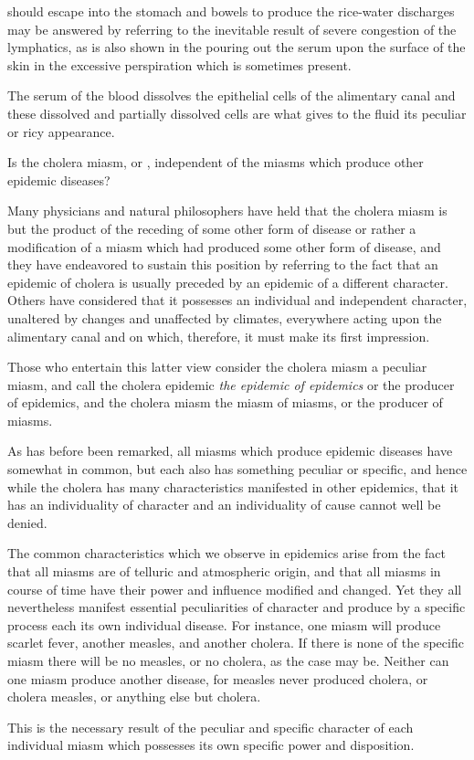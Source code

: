 should escape into the stomach and bowels to produce the rice-water
discharges may be answered by referring to the inevitable result of severe
congestion of the lymphatics, as is also shown in the pouring out the
serum upon the surface of the skin in the excessive perspiration which
is sometimes present.

The serum of the blood dissolves the epithelial cells of the alimentary
canal and these dissolved and partially dissolved cells are what gives to
the fluid its peculiar or ricy appearance.

\vspace{\baselineskip}

Is the cholera miasm, or , independent of the miasms which
produce other epidemic diseases?

Many physicians and natural philosophers have held that the cholera
miasm is but the product of the receding of some other form of disease
or rather a modification of a miasm which had produced some other
form of disease, and they have endeavored to sustain this position by
referring to the fact that an epidemic of cholera is usually preceded by
an epidemic of a different character. Others have considered that it
possesses an individual and independent character, unaltered by changes
and unaffected by climates, everywhere acting upon the alimentary canal
and on which, therefore, it must make its first impression.

Those who entertain this latter view consider the cholera miasm a
peculiar miasm, and call the cholera epidemic \emph{the epidemic of epidemics}
or the producer of epidemics, and the cholera miasm the miasm of
miasms, or the producer of miasms.

As has before been remarked, all miasms which produce epidemic
diseases have somewhat in common, but each also has something peculiar
or specific, and hence while the cholera has many characteristics
manifested in other epidemics, that it has an individuality of character
and an individuality of cause cannot well be denied.

The common characteristics which we observe in epidemics arise
from the fact that all miasms are of telluric and atmospheric origin,
and that all miasms in course of time have their power and influence
modified and changed. Yet they all nevertheless manifest essential
peculiarities of character and produce by a specific process each its own
individual disease. For instance, one miasm will produce scarlet fever,
another measles, and another cholera. If there is none of the specific
miasm there will be no measles, or no cholera, as the case may be.
Neither can one miasm produce another disease, for measles never produced
cholera, or cholera measles, or anything else but cholera.

This is the necessary result of the peculiar and specific character of
each individual miasm which possesses its own specific power and disposition.\endinput